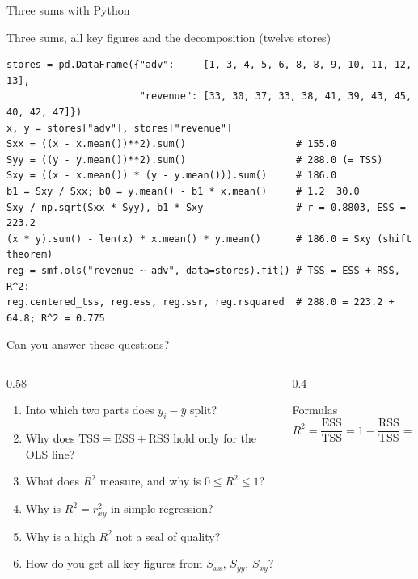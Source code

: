 \documentclass[aspectratio=169,11pt]{beamer}
\begin{document}
\begin{frame}[fragile]{Three sums with Python}
  \vspace{-4pt}
  \begin{block}{Three sums, all key figures and the decomposition (twelve stores)}
\begin{lstlisting}
stores = pd.DataFrame({"adv":     [1, 3, 4, 5, 6, 8, 8, 9, 10, 11, 12, 13],
                       "revenue": [33, 30, 37, 33, 38, 41, 39, 43, 45, 40, 42, 47]})
x, y = stores["adv"], stores["revenue"]
Sxx = ((x - x.mean())**2).sum()                   # 155.0
Syy = ((y - y.mean())**2).sum()                   # 288.0 (= TSS)
Sxy = ((x - x.mean()) * (y - y.mean())).sum()     # 186.0
b1 = Sxy / Sxx; b0 = y.mean() - b1 * x.mean()     # 1.2  30.0
Sxy / np.sqrt(Sxx * Syy), b1 * Sxy                # r = 0.8803, ESS = 223.2
(x * y).sum() - len(x) * x.mean() * y.mean()      # 186.0 = Sxy (shift theorem)
reg = smf.ols("revenue ~ adv", data=stores).fit() # TSS = ESS + RSS, R^2:
reg.centered_tss, reg.ess, reg.ssr, reg.rsquared  # 288.0 = 223.2 + 64.8; R^2 = 0.775
\end{lstlisting}
  \end{block}
\end{frame}

\begin{frame}{Can you answer these questions?}
  \small
  \begin{columns}[T]
    \begin{column}{0.58\textwidth}
      \begin{enumerate}
        \setlength{\itemsep}{1pt}
        \item Into which two parts does $y_i - \bar{y}$ split?
        \item Why does $\text{TSS} = \text{ESS} + \text{RSS}$ hold only for
              the OLS line?
        \item What does $R^{2}$ measure, and why is $0 \le R^{2} \le 1$?
        \item Why is $R^{2} = r_{xy}^{2}$ in simple regression?
        \item Why is a high $R^{2}$ not a seal of quality?
        \item How do you get all key figures from $S_{xx}$, $S_{yy}$, $S_{xy}$?
      \end{enumerate}
    \end{column}
    \begin{column}{0.4\textwidth}
      \begin{block}{Formulas}
        \[
          R^{2} = \frac{\text{ESS}}{\text{TSS}} = 1 - \frac{\text{RSS}}{\text{TSS}} = r_{xy}^{2}
        \]
        \vspace{-10pt}
      \end{block}
    \end{column}
  \end{columns}

  \medskip
\end{frame}
\end{document}
